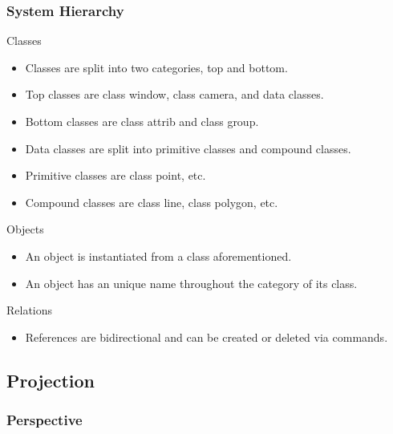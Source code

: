 \documentclass[10pt]{beamer}
\begin{document}
\begin{frame}[t] \frametitle{System Hierarchy}

	\begin{block}{Classes}
		\begin{itemize}
			\item Classes are split into two categories, top and bottom.
			\item Top classes are class window, class camera, and data classes.
			\item Bottom classes are class attrib and class group.
			\item Data classes are split into primitive classes and compound classes.
			\item Primitive classes are class point, etc.
			\item Compound classes are class line, class polygon, etc.
		\end{itemize}
	\end{block}

	\begin{block}{Objects}
		\begin{itemize}
			\item An object is instantiated from a class aforementioned.
			\item An object has an unique name throughout the category of its class.
		\end{itemize}
	\end{block}

	\begin{block}{Relations}
		\begin{itemize}
			\item References are bidirectional and can be created or deleted via commands.
		\end{itemize}
	\end{block}

\end{frame}

\subsection{Projection}

\subsubsection{Perspective}
\end{document}
